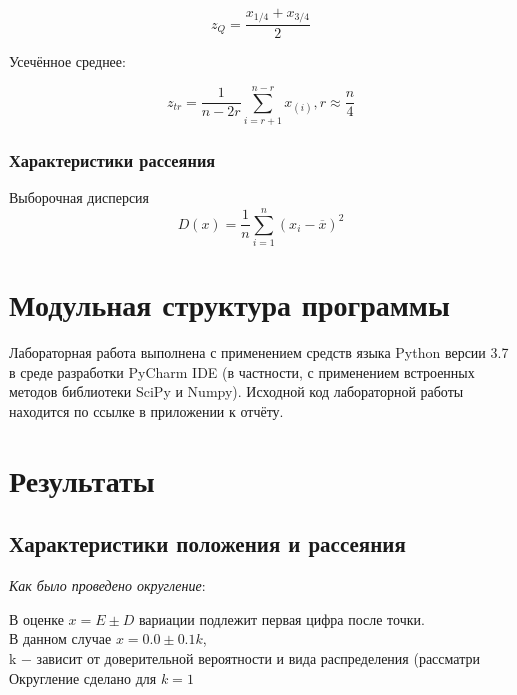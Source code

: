 \documentclass[a4paper]{article}
\begin{document}
\begin{itemize}
\begin{item}
                \end{item}
                \begin{equation}\label{quart}
                    \textit{z}_Q = \dfrac{x_{1/4} + x_{3/4}}{2}
                \end{equation}
                
                \begin{item}
                    Усечённое среднее:
                \end{item}
                \begin{equation}\label{trunc}
                    \textit{z}_{\textit{tr}} = \dfrac{1}{\textit{n} - 2\textit{r}}\sum\limits_{i=r + 1}^{n-r} x_{(i)}, r \approx \dfrac{n}{4}
                \end{equation}
        
            \end{itemize}
        \subsubsection{Характеристики рассеяния}
            Выборочная дисперсия
            \begin{equation}
                D(x) = \dfrac{1}{\textit{n}}\sum\limits_{i=1}^n {(x_i - \overline{x})}^2
            \end{equation}
            
        
\section{Модульная структура программы}
Лабораторная работа выполнена с применением средств языка Python версии 3.7 в среде разработки PyCharm IDE (в частности, с применением встроенных методов библиотеки SciPy и Numpy). Исходной код лабораторной работы находится по ссылке в приложении к отчёту.
\section{Результаты}
    \subsection{Характеристики положения и рассеяния}
    \textit{Как было проведено округление}:
    
В оценке $x = E \pm D$ вариации подлежит первая цифра после точки.\\
\indent В данном случае $x = 0.0 \pm 0.1k$,\\
\indent k − зависит от доверительной вероятности и вида распределения (рассматри\\
\indent Округление сделано для $k = 1$        
    
\end{document}
